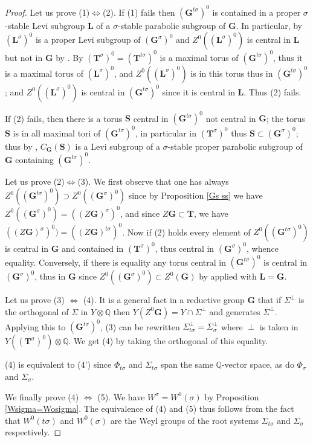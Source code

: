 \documentclass{amsart}
\numberwithin{equation}{section}
\theoremstyle{definition}
\theoremstyle{remark}
\newcommand\bG{{\mathbf G}}
\newcommand\bL{{\mathbf L}}
\newcommand\bS{{\mathbf S}}
\newcommand\bT{{\mathbf T}}
\newcommand\BQ{{\mathbb Q}}
\newcommand\Gtso{{(\bG^{t\sigma})^0}}
\newcommand\Gs{{\bG^\sigma}}
\newcommand\Gso{{(\Gs)^0}}
\newcommand\Lso{{(\bL^\sigma)^0}}
\newcommand\Tso{{(\bT^\sigma)^0}}
\begin{document}
\begin{proof}
Let us prove (1)$\Leftrightarrow$(2). If (1) fails then $\Gtso$ is
contained   in  a   proper  $\sigma$-stable   Levi  subgroup   $\bL$  of  a
$\sigma$-stable   parabolic   subgroup   of   $\bG$.   In   particular,  by
\cite[1.25]{grnc}   $\Lso$  is  a  proper   Levi  subgroup  of  $\Gso$  and
$Z^0(\Lso)$  is  central  in $\bL$ but not in $\bG$ by
\cite[1.23]{grnc}.  By \cite[1.8(iii)]{grnc}  $\Tso=(\bT^{t\sigma})^0$ is a
maximal  torus  of  $\Gtso$,  thus  it  is  a maximal torus of $\Lso$, and
$Z^0(\Lso)$ is in this torus thus in $\Gtso$; and $Z^0(\Lso)$ is central in
$\Gtso$ since it is central in $\bL$. Thus (2) fails.

If (2) fails, then there is a torus $\bS$ central in $\Gtso$ not central in
$\bG$;  the torus $\bS$ is in all maximal tori of $\Gtso$, in particular in
$\Tso$ thus $\bS\subset\Gso$; thus by \cite[1.25(ii)]{grnc},
$C_\bG(\bS)$ is a Levi subgroup of
a $\sigma$-stable proper parabolic subgroup of $\bG$ containing $\Gtso$.

Let us prove (2)$\Leftrightarrow$(3). We first observe that one has always
$Z^0(\Gtso)\supset Z^0(\Gso)$ since by Proposition \ref{Gs ss} we have
$Z^0(\Gso)=((Z\bG)^{\sigma})^0$, and since $Z\bG\subset\bT$, we have
$((Z\bG)^{\sigma})^0)=((Z\bG)^{t\sigma})^0$.
Now if (2) holds every element of $Z^0(\Gtso)$ is central in $\bG$ and
contained in $\Tso$, thus
central in $\Gso$, whence equality. Conversely, if there is equality any
torus central in $\Gtso$ is central in $\Gso$, thus in $\bG$ since
$Z^0(\Gso)\subset Z^0(\bG)$ by \cite[1.23]{grnc} applied with $\bL=\bG$.

Let us prove (3) $\Leftrightarrow$ (4).  It is a general fact in a reductive
group $\bG$ that if $\Sigma^\perp$ is the orthogonal of $\Sigma$ in 
$Y\otimes\BQ$ then $Y(Z^0\bG)=Y\cap \Sigma^\perp$ and generates $\Sigma^\perp$.
Applying this to $\Gtso$, (3) can be rewritten
$\Sigma_{t\sigma}^\perp=\Sigma_\sigma^\perp$ where $\perp$ is taken in
$Y(\Tso)\otimes\BQ$.
We get (4) by taking the orthogonal of this equality.

(4) is equivalent to (4') since $\Phi_{t\sigma}$ and $\Sigma_{t\sigma}$ 
span the same $\BQ$-vector space,
as do $\Phi_{\sigma}$ and $\Sigma_{\sigma}$.

We finally prove (4) $\Leftrightarrow$ (5).
We have $W^\sigma=W^0(\sigma)$ by Proposition \ref{Wsigma=Wosigma}. The equivalence
of (4) and (5) thus follows from the fact that
$W^0(t\sigma)$ and $W^0(\sigma)$ are the Weyl groups of the root systems
$\Sigma_{t\sigma}$ and $\Sigma_\sigma$ respectively.
\end{proof}
\end{document}
